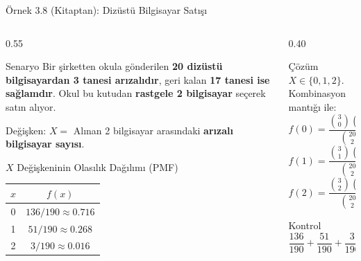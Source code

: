 \documentclass[light]{lutbeamer}
\begin{document}
\begin{frame}{Örnek 3.8 (Kitaptan): Dizüstü Bilgisayar Satışı}
\footnotesize
\begin{columns}[T]
  \begin{column}{0.55\textwidth}
\begin{block}{Senaryo}
  Bir şirketten okula gönderilen \textbf{20 dizüstü bilgisayardan 3 tanesi arızalıdır},
  geri kalan \textbf{17 tanesi ise sağlamdır}. Okul bu kutudan
  \textbf{rastgele 2 bilgisayar} seçerek satın alıyor.
  
  \vspace{0.15cm}
  Değişken: $X =$ Alınan 2 bilgisayar arasındaki \textbf{arızalı bilgisayar sayısı}.
\end{block}

    \begin{block}{$X$ Değişkeninin Olasılık Dağılımı (PMF)}
      \centering
      \begin{tabular}{cc}
        \toprule
        $x$ & $f(x)$ \\
        \midrule
        0 & $136/190 \approx 0.716$ \\
        1 & $51/190 \approx 0.268$ \\
        2 & $3/190 \approx 0.016$ \\
        \bottomrule
      \end{tabular}
    \end{block}

  \end{column}
  \begin{column}{0.40\textwidth}
    \begin{alertblock}{Çözüm}
      $X \in \{0, 1, 2\}$. Kombinasyon mantığı ile:
      \[
      f(0) = \frac{\binom{3}{0}\binom{17}{2}}{\binom{20}{2}} = \frac{136}{190}
      \]
      \[
      f(1) = \frac{\binom{3}{1}\binom{17}{1}}{\binom{20}{2}} = \frac{51}{190}
      \]
      \[
      f(2) = \frac{\binom{3}{2}\binom{17}{0}}{\binom{20}{2}} = \frac{3}{190}
      \]
    \end{alertblock}

    \begin{block}{Kontrol}
      \[
      \frac{136}{190} + \frac{51}{190} + \frac{3}{190} = \frac{190}{190} = 1 \;\checkmark
      \]
    \end{block}
  \end{column}
\end{columns}
\end{frame}
\end{document}
